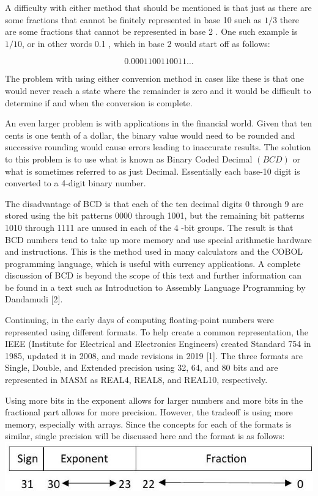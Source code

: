 \documentclass[10pt]{article}
\begin{document}
A difficulty with either method that should be mentioned is that just as there are some fractions that cannot be finitely represented in base 10 such as $1 / 3$ there are some fractions that cannot be represented in base 2 . One such example is $1 / 10$, or in other words 0.1 , which in base 2 would start off as follows:

$$
0.0001100110011 \ldots
$$

The problem with using either conversion method in cases like these is that one would never reach a state where the remainder is zero and it would be difficult to determine if and when the conversion is complete.

An even larger problem is with applications in the financial world. Given that ten cents is one tenth of a dollar, the binary value would need to be rounded and successive rounding would cause errors leading to inaccurate results. The solution to this problem is to use what is known as Binary Coded Decimal $(B C D)$ or what is sometimes referred to as just Decimal. Essentially each base-10 digit is converted to a 4-digit binary number.

The disadvantage of BCD is that each of the ten decimal digits 0 through 9 are stored using the bit patterns 0000 through 1001, but the remaining bit patterns 1010 through 1111 are unused in each of the 4 -bit groups. The result is that BCD numbers tend to take up more memory and use special arithmetic hardware and instructions. This is the method used in many calculators and the COBOL programming language, which is useful with currency applications. A complete discussion of BCD is beyond the scope of this text and further information can be found in a text such as Introduction to Assembly Language Programming by Dandamudi [2].

Continuing, in the early days of computing floating-point numbers were represented using different formats. To help create a common representation, the IEEE (Institute for Electrical and Electronics Engineers) created Standard 754 in 1985, updated it in 2008, and made revisions in 2019 [1]. The three formats are Single, Double, and Extended precision using 32, 64, and 80 bits and are represented in MASM as REAL4, REAL8, and REAL10, respectively.

Using more bits in the exponent allows for larger numbers and more bits in the fractional part allows for more precision. However, the tradeoff is using more memory, especially with arrays. Since the concepts for each of the formats is similar, single precision will be discussed here and the format is as follows:\\
\includegraphics[max width=\textwidth, center]{2025_03_24_ebe50cc223a6fbc49eecg-320}
\end{document}

